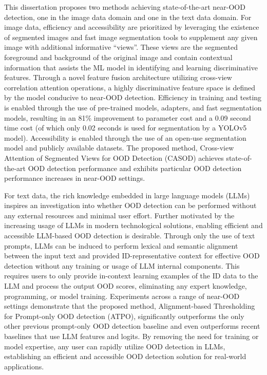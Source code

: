 \documentclass[12pt,reqno,oneside]{amsbook}
\theoremstyle{definition}
\newcommand{\?}{\stackrel{?}{=}}
\begin{document}
This dissertation proposes two methods achieving state-of-the-art near-OOD detection, one in the image data domain and one in the text data domain. For image data, efficiency and accessibility are prioritized by leveraging the existence of segmented images and fast image segmentation tools to supplement any given image with additional informative ``views''. These views are the segmented foreground and background of the original image and contain contextual information that assists the ML model in identifying and learning discriminative features. Through a novel feature fusion architecture utilizing cross-view correlation attention operations, a highly discriminative feature space is defined by the model conducive to near-OOD detection. Efficiency in training and testing is enabled through the use of pre-trained models, adapters, and fast segmentation models, resulting in an 81\% improvement to parameter cost and a 0.09 second time cost (of which only 0.02 seconds is used for segmentation by a YOLOv5 model). Accessibility is enabled through the use of an open-use segmentation model and publicly available datasets. The proposed method, Cross-view Attention of Segmented Views for OOD Detection (CASOD) achieves state-of-the-art OOD detection performance and exhibits particular OOD detection performance increases in near-OOD settings.

For text data, the rich knowledge embedded in large language models (LLMs) inspires an investigation into whether OOD detection can be performed without any external resources and minimal user effort. Further motivated by the increasing usage of LLMs in modern technological solutions, enabling efficient and accessible LLM-based OOD detection is desirable. Through only the use of text prompts, LLMs can be induced to perform lexical and semantic alignment between the input text and provided ID-representative context for effective OOD detection without any training or usage of LLM internal components. This requires users to only provide in-context learning examples of the ID data to the LLM and process the output OOD scores, eliminating any expert knowledge, programming, or model training. Experiments across a range of near-OOD settings demonstrate that the proposed method, Alignment-based Thresholding for Prompt-only OOD detection (ATPO), significantly outperforms the only other previous prompt-only OOD detection baseline and even outperforms recent baselines that use LLM features and logits. By removing the need for training or model expertise, any user can rapidly utilize OOD detection in LLMs, establishing an efficient and accessible OOD detection solution for real-world applications.
\end{document}
